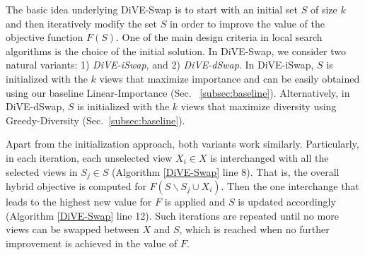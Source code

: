 The basic idea underlying DiVE-Swap is to start with an initial set $S$ of size $k$ and then iteratively modify the set $S$ in order to improve the value of the objective function $F(S)$. 
%
One of the main design criteria in local search algorithms is the choice of the initial solution. 
%
In DiVE-Swap, we consider two natural variants: 1) {\em DiVE-iSwap}, and 2) {\em DiVE-dSwap}. 
%
In DiVE-iSwap, $S$ is initialized with the $k$ views that maximize importance and can be easily obtained using our baseline Linear-Importance (Sec. ~\ref{subsec:baseline}).
%
Alternatively, in DiVE-dSwap, $S$ is initialized with the $k$ views that maximize diversity using Greedy-Diversity (Sec.~\ref{subsec:baseline}).
%

Apart from the initialization approach, both variants work similarly. 
%
Particularly, in each iteration, each unselected view $X_i \in X$ is interchanged with all the selected views in $S_j \in S$ (Algorithm \ref{DiVE-Swap} line 8). 
%
That is, the overall hybrid objective is computed for $F(S \backslash S_j \cup X_i)$.  
%
Then the one interchange that leads to the highest new value for $F$ is applied and $S$ is updated accordingly (Algorithm \ref{DiVE-Swap} line 12). 
%
Such iterations are repeated until no more views can be swapped between $X$ and $S$, which is reached when no further improvement is achieved in the value of $F$.   


